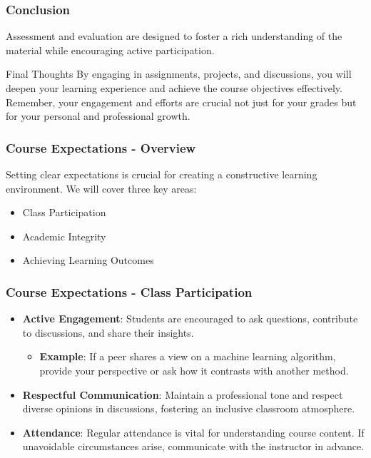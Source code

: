 \documentclass[aspectratio=169]{beamer}
\begin{document}
\begin{frame}[fragile]
    \frametitle{Conclusion}
    Assessment and evaluation are designed to foster a rich understanding of the material while encouraging active participation. 
    \begin{block}{Final Thoughts}
        By engaging in assignments, projects, and discussions, you will deepen your learning experience and achieve the course objectives effectively. Remember, your engagement and efforts are crucial not just for your grades but for your personal and professional growth.
    \end{block}
\end{frame}

\begin{frame}[fragile]
    \frametitle{Course Expectations - Overview}
    Setting clear expectations is crucial for creating a constructive learning environment. 
    We will cover three key areas:
    \begin{itemize}
        \item Class Participation
        \item Academic Integrity
        \item Achieving Learning Outcomes
    \end{itemize}
\end{frame}

\begin{frame}[fragile]
    \frametitle{Course Expectations - Class Participation}
    \begin{itemize}
        \item \textbf{Active Engagement}: 
        Students are encouraged to ask questions, contribute to discussions, and share their insights.
        \begin{itemize}
            \item \textbf{Example}: If a peer shares a view on a machine learning algorithm, provide your perspective or ask how it contrasts with another method.
        \end{itemize}
        
        \item \textbf{Respectful Communication}: 
        Maintain a professional tone and respect diverse opinions in discussions, fostering an inclusive classroom atmosphere.

        \item \textbf{Attendance}: 
        Regular attendance is vital for understanding course content. If unavoidable circumstances arise, communicate with the instructor in advance.
    \end{itemize}
\end{frame}
\end{document}

